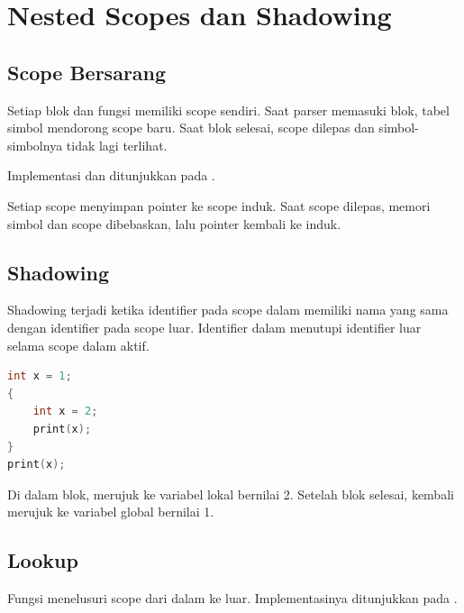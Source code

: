 \section{Nested Scopes dan Shadowing}
\label{sec:ch15-scope}

\subsection{Scope Bersarang}

Setiap blok dan fungsi memiliki scope sendiri. Saat parser memasuki
blok, tabel simbol mendorong scope baru. Saat blok selesai, scope
dilepas dan simbol-simbolnya tidak lagi terlihat.

Implementasi  dan
 ditunjukkan pada
.


Setiap scope menyimpan pointer ke scope induk. Saat scope dilepas,
memori simbol dan scope dibebaskan, lalu pointer kembali ke induk.

\subsection{Shadowing}

\begin{definisi}[Shadowing]
Shadowing terjadi ketika identifier pada scope dalam memiliki nama
yang sama dengan identifier pada scope luar. Identifier dalam
menutupi identifier luar selama scope dalam aktif.
\end{definisi}

\begin{contoh}[Shadowing]
\begin{lstlisting}[language=C]
int x = 1;
{
    int x = 2;
    print(x);
}
print(x);
\end{lstlisting}
Di dalam blok,  merujuk ke variabel lokal bernilai 2.
Setelah blok selesai,  kembali merujuk ke variabel global
bernilai 1.
\end{contoh}

\subsection{Lookup}

Fungsi  menelusuri scope dari dalam ke luar.
Implementasinya ditunjukkan pada .

